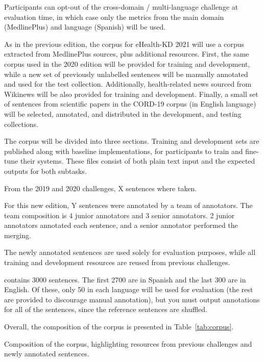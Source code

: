 \documentclass[a4paper,11pt,twocolumn,twoside]{article}
\begin{document}
Participants can opt-out of the cross-domain / multi-language challenge at evaluation time, 
in which case only the metrics from the main domain (MedlinePlus) and language (Spanish) will be used.

As in the previous edition, the corpus for eHealth-KD 2021 will use a corpus extracted from MedlinePlus sources, plus additional resources. 
First, the same corpus used in the 2020 edition will be provided for training and development, while a new set of previously unlabelled sentences will be manually annotated and used for the test collection. Additionally, health-related news sourced from Wikinews will be also provided for training and development. 
Finally, a small set of sentences from scientific papers in the CORD-19 corpus (in English language) will be selected, annotated, and distributed in the development, and testing collections.


The corpus will be divided into three sections. Training and development sets are published along with baseline implementations, 
for participants to train and fine-tune their systems. These files consist of both plain text input and the expected outputs for both subtasks.


From the 2019 and 2020 challenges, X sentences where taken.

For this new edition, Y sentences were annotated by a team of annotators.
The team composition is 4 junior annotators and 3 senior annotators.
2 junior annotators annotated each sentence, and a senior annotator performed the merging.

The newly annotated sentences are used solely for evaluation purposes,
while all training and development resources are reused from previous challenges.

contains 3000 sentences. The first 2700 are in Spanish and the last 300 are in English. Of these, only 50 in each language will 
be used for evaluation (the rest are provided to discourage manual annotation), but you must output annotations for all of the sentences,
since the reference sentences are shuffled.

Overall, the composition of the corpus is presented in Table~\ref{tab:corpus}.

\begin{table}
  \caption{Composition of the corpus, highlighting resources from previous
  challenges and newly annotated sentences.\label{tab:corpus}}
\end{table}
\end{document}
